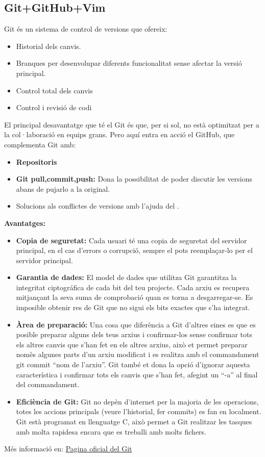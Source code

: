 \subsection{Git+GitHub+Vim}\label{subsec:Git+GitHub+Vim}
Git és un sistema de control de versions que ofereix:
\begin{itemize}
 \item Historial dels canvis.
 \item Branques per desenvolupar diferents funcionalitat sense afectar la versió principal.
 \item Control total dels canvis
 \item Control i revisió de codi
\end{itemize}
El principal desavantatge que té el Git és que, per si sol, no està optimitzat per a la col·laboració en equips grans. Pero aquí entra en acció el GitHub, que complementa Git amb:
\begin{itemize}
\item \textbf{Repositoris}
 \item \textbf{Git pull,commit,push:} Dona la possibilitat de poder discutir les versions abans de pujarlo a la original.
 \item Solucions als conflictes de versions amb l'ajuda del .
 \end{itemize}

\textbf{Avantatges:}

\begin{itemize}
 \item \textbf{Copia de seguretat:} Cada usuari té una copia de seguretat del servidor principal, en el cas d'errors o corrupció, sempre el pots reemplaçar-lo per el servidor principal.
 \item \textbf{Garantia de dades:} El model de dades que utilitza Git garantitza la integritat ciptográfica de cada bit del teu projecte. Cada arxiu es recupera mitjançant la seva suma de comprobació quan es torna a desgarregar-se. Es imposible obtenir res de Git que no sigui els bits exactes que s'ha integrat.
 \item \textbf{Àrea de preparació:} Una cosa que diferència a Git d'altres eines es que es posible preparar alguns dels teus arxius i confirmar-los sense confirmar tots els altres canvis que s'han fet en els altres arxius, això et permet preparar nomès algunes parts d'un arxiu modificat i es realitza amb el commandament git commit ``nom de l'arxiu''. Git també et dona la opció d'ignorar aquesta característica i confirmar tots els canvis que s'han fet, afegint un ``-a'' al final del commandament.
 \item \textbf{Eficiència de Git:} Git no depèn d'internet per la majoria de les operacions, totes les accions principals (veure l'historial, fer commits) es fan en localment. Git està programat en llenguatge C, això permet a Git realitzar les tasques amb molta rapidesa encara que es treballi amb molts fichers.
\end{itemize}
Més informació en: \href{https://git-scm.com/about/branching-and-merging}{Pagina oficial del Git}

